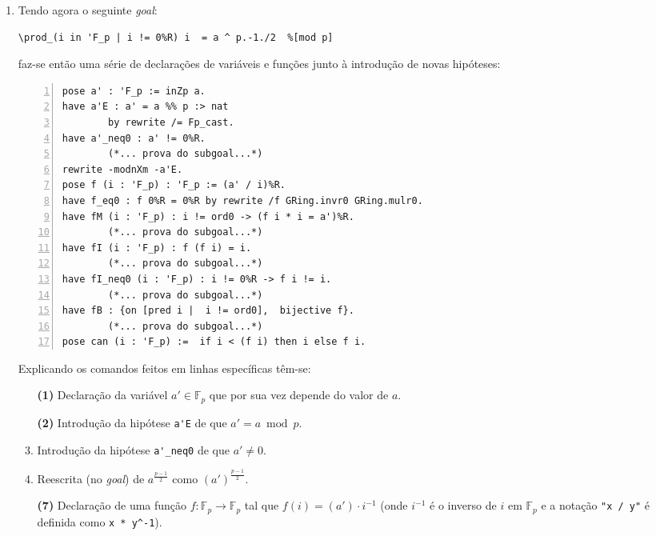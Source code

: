 \begin{enumerate}[label=\textbf{\roman*.}]
        \item Tendo agora o seguinte \textit{goal}:
        \begin{lstlisting}[language=coq,frame=single,tabsize=1]
\prod_(i in 'F_p | i != 0%R) i  = a ^ p.-1./2  %[mod p]
        \end{lstlisting}
        faz-se então uma série de declarações de variáveis e funções junto à introdução de novas hipóteses:
        \begin{lstlisting}[language=coq,frame=single, numbers=left,stepnumber=1,tabsize=1]
pose a' : 'F_p := inZp a.
have a'E : a' = a %% p :> nat
        by rewrite /= Fp_cast.
have a'_neq0 : a' != 0%R.
        (*... prova do subgoal...*)
rewrite -modnXm -a'E.
pose f (i : 'F_p) : 'F_p := (a' / i)%R. 
have f_eq0 : f 0%R = 0%R by rewrite /f GRing.invr0 GRing.mulr0. 
have fM (i : 'F_p) : i != ord0 -> (f i * i = a')%R. 
        (*... prova do subgoal...*)
have fI (i : 'F_p) : f (f i) = i.
        (*... prova do subgoal...*)
have fI_neq0 (i : 'F_p) : i != 0%R -> f i != i.
        (*... prova do subgoal...*)
have fB : {on [pred i |  i != ord0],  bijective f}.
        (*... prova do subgoal...*)
pose can (i : 'F_p) :=  if i < (f i) then i else f i.
        \end{lstlisting}
        Explicando os comandos feitos em linhas específicas têm-se:
        \begin{enumerate}
                \item[\textbf{(1)}] Declaração da variável $a' \in \mathbb{F}_p$ que por sua vez depende do valor de $a$.
                
                \item[\textbf{(2)}] Introdução da hipótese \lstinline[language=coq]|a'E| de que $a' = a \bmod{p}$.
                
                \item[\textbf{(4)}] Introdução da hipótese \lstinline[language=coq]|a'_neq0| de que $a' \neq 0$.
                
                \item[\textbf{(6)}] Reescrita (no \textit{goal}) de $a^{\frac{p-1}{2}}$ como $(a')^{\frac{p-1}{2}}$.
                
                \item[\textbf{(7)}] Declaração de uma função $f : \mathbb{F}_p \rightarrow \mathbb{F}_p$ tal que $f(i) = (a') \cdot i^{-1}$ (onde $i^{-1}$ é o inverso de $i$ em $\mathbb{F}_p$ e a notação \lstinline[language=coq]|"x / y"| é definida como \lstinline[language=coq]|x * y^-1|).
                

\end{enumerate}
\end{enumerate}
